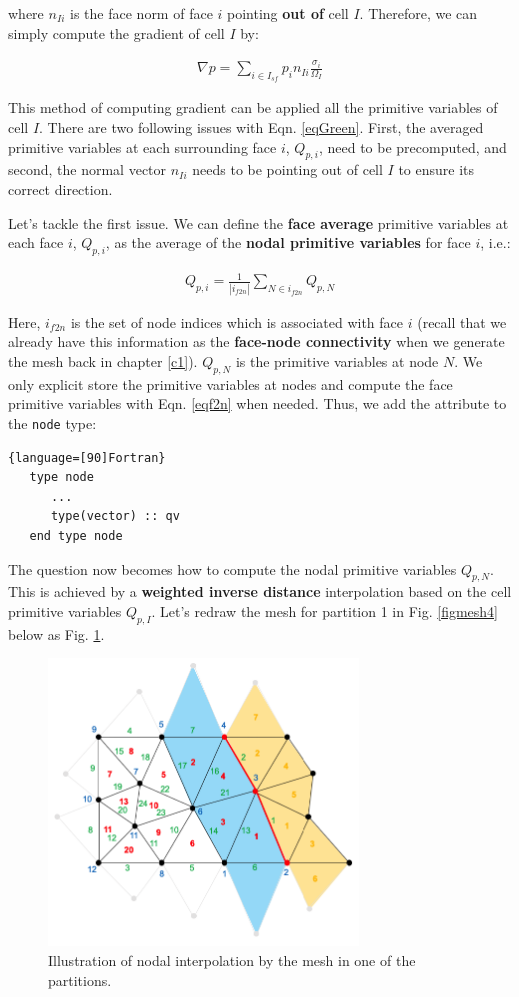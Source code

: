 \documentclass[12pt, letterpaper]{report}
\begin{document}
where $n_{Ii}$ is the face norm of face $i$ pointing {\bf out of} cell $I$. Therefore, we can simply
compute the gradient of cell $I$ by:

\begin{align}\label{eqGreen}
   \nabla p = \sum_{i \in I_{sf}} p_i n_{Ii} \frac{\sigma_i}{\Omega_I}
\end{align}

This method of computing gradient can be applied all the primitive variables of cell $I$. There are
two following issues with Eqn. \ref{eqGreen}. First, the averaged primitive variables at each
surrounding face $i$, $Q_{p,i}$, need to be precomputed, and second, the normal vector $n_{Ii}$
needs to be pointing out of cell $I$ to ensure its correct direction. \paraspace

Let's tackle the first issue. We can define the {\bf face average} primitive variables at each
face $i$, $Q_{p,i}$, as the average of the {\bf nodal primitive variables} for face $i$, i.e.:

\begin{align}\label{eqf2n}
   Q_{p,i} = \frac{1}{|i_{f2n}|} \sum_{N \in i_{f2n}} Q_{p,N}
\end{align}

Here, $i_{f2n}$ is the set of node indices which is associated with face $i$ (recall that we already
have this information as the {\bf face-node connectivity} when we generate the mesh back in chapter
\ref{c1}). $Q_{p,N}$ is the primitive variables at node $N$. We only explicit store the primitive
variables at nodes and compute the face primitive variables with Eqn. \ref{eqf2n} when needed.
Thus, we add the attribute to the \verb+node+ type:

\begin{lstlisting}{language=[90]Fortran}
   type node
      ...
      type(vector) :: qv
   end type node
\end{lstlisting}

The question now becomes how to compute the nodal primitive variables $Q_{p,N}$. This is achieved by
a {\bf weighted inverse distance} interpolation based on the cell primitive variables $Q_{p,I}$.
Let's redraw the mesh for partition 1 in Fig. \ref{figmesh4} below as Fig. \ref{figalg2}.

\begin{figure}[H]
   \centering
   \includegraphics[height=3in]{Algorithm2.png}
   \caption{Illustration of nodal interpolation by the mesh in one of the partitions.}
   \label{figalg2}
\end{figure}
\end{document}
